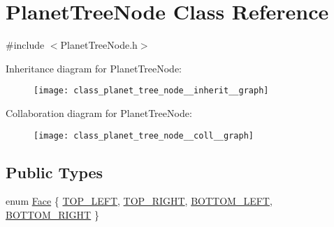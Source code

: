 \hypertarget{class_planet_tree_node}{\section{Planet\+Tree\+Node Class Reference}
\label{class_planet_tree_node}
}


{\ttfamily \#include $<$Planet\+Tree\+Node.\+h$>$}



Inheritance diagram for Planet\+Tree\+Node\+:\nopagebreak
\begin{figure}[H]
\begin{center}
\leavevmode
\texttt{[image: class\_planet\_tree\_node\_\_inherit\_\_graph]}
\end{center}
\end{figure}


Collaboration diagram for Planet\+Tree\+Node\+:\nopagebreak
\begin{figure}[H]
\begin{center}
\leavevmode
\texttt{[image: class\_planet\_tree\_node\_\_coll\_\_graph]}
\end{center}
\end{figure}
\subsection*{Public Types}
\begin{DoxyCompactItemize}
\item 
enum \hyperlink{class_planet_tree_node_a6083412108802a50ff0ef1fd7806006c}{Face} \{ \hyperlink{class_planet_tree_node_a6083412108802a50ff0ef1fd7806006cacd8fb9f35d21bd0306526d2d7ce9f305}{T\+O\+P\+\_\+\+L\+E\+F\+T}, 
\hyperlink{class_planet_tree_node_a6083412108802a50ff0ef1fd7806006caf267b6582de2e842c8a8c43ef073b05c}{T\+O\+P\+\_\+\+R\+I\+G\+H\+T}, 
\hyperlink{class_planet_tree_node_a6083412108802a50ff0ef1fd7806006ca59295adcd412488cd24833ea86231d52}{B\+O\+T\+T\+O\+M\+\_\+\+L\+E\+F\+T}, 
\hyperlink{class_planet_tree_node_a6083412108802a50ff0ef1fd7806006ca8fe618ad036bb0edb8bf357e138c851a}{B\+O\+T\+T\+O\+M\+\_\+\+R\+I\+G\+H\+T}
 \}
\end{DoxyCompactItemize}
